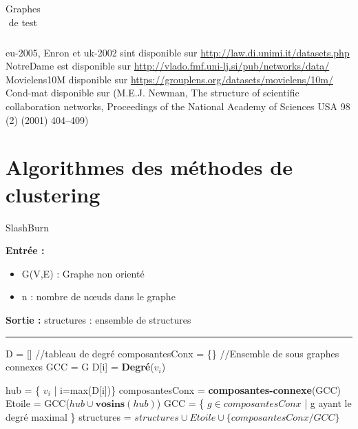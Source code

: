 \documentclass[a4paper,oneside,12pt]{report}
\theoremstyle{definition}
\begin{document}
\begin{appendix}
\begin{table}[H]
\begin{tabular}{|C{5cm}|C{4.5cm}|C{4.5cm}|}
\end{tabular}
									\caption{Graphes de test}									\label{comgen}

 								\end{table}
\end{appendix}


eu-2005, Enron et uk-2002 sint disponible sur \url{http://law.di.unimi.it/datasets.php}\\
NotreDame est disponible sur \url{http://vlado.fmf.uni-lj.si/pub/networks/data/} \\
Movielens10M disponible sur \url{https://grouplens.org/datasets/movielens/10m/}\\
Cond-mat  disponible sur (M.E.J. Newman, The structure of scientific collaboration networks, Proceedings of the National Academy of Sciences USA 98 (2) (2001) 404–409)




\newpage


\chapter{Algorithmes des méthodes de clustering}

\label{SlashBurn}

\begin{algorithm}[H]
					\label{alg:SlashBurn}
					\caption{SlashBurn}
					\textbf{Entrée :}
						\begin{itemize}[label=$\bullet$]
							\item G(V,E) : Graphe non orienté 
							\item n : nombre de nœuds dans le graphe 
							
						\end{itemize}
					\textbf{Sortie :} structures : ensemble de structures\\							\noindent\rule{\textwidth}{1pt}
						
						
				\begin{algorithmic} [1]
				
				 \STATE D = [] //tableau de degré
				 \STATE composantesConx = \{\} //Ensemble de sous graphes connexes
				 \STATE GCC = G			 
				 \STATE D[i] = \textbf{Degré}($v_i$)
				 \ENDFOR
				 
					\STATE hub = \{ $v_i$ | i=max(D[i])\}
					\STATE composantesConx = \textbf{composantes-connexe}(GCC)
					\STATE Etoile = GCC($hub \cup \textbf{vosins}(hub)$)
					\STATE GCC = \{ $g \in composantesConx$ | g ayant le degré maximal \}
					\STATE structures = $structures \cup Etoile \cup \{composantesConx/GCC\}$
					
					\ENDWHILE
				
				
				\end{algorithmic}
			\end{algorithm}
\end{document}
